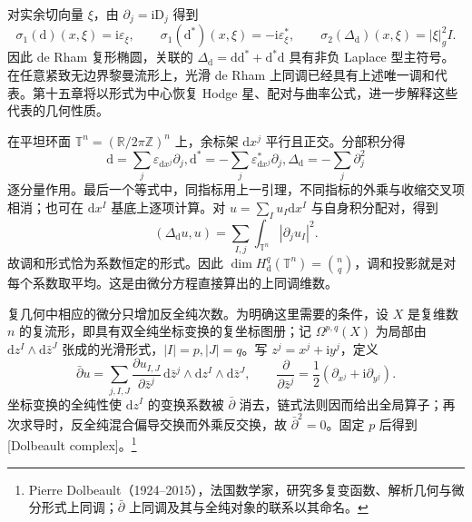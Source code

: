 对实余切向量 \(\xi\)，由 \(\partial_j=\mathrm i\mathrm D_j\) 得到
\[
	\sigma_1(\mathrm d)(x,\xi)=\mathrm i\varepsilon_\xi,
	\qquad
	\sigma_1(\mathrm d^*)(x,\xi)=-\mathrm i\varepsilon_\xi^*,
	\qquad
	\sigma_2(\Delta_{\mathrm d})(x,\xi)=|\xi|_g^2I.
\]
因此 de Rham 复形椭圆，关联的 \(\Delta_{\mathrm d}=\mathrm d\mathrm d^*+\mathrm d^*\mathrm d\) 具有非负 Laplace 型主符号。在任意紧致无边界黎曼流形上，光滑 de Rham 上同调已经具有上述唯一调和代表。第十五章将以形式为中心恢复 Hodge 星、配对与曲率公式，进一步解释这些代表的几何性质。

\begin{example}\label{g3:exm:flat-torus-harmonic-forms}
	在平坦环面 \(\mathbb T^n=(\mathbb R/2\pi\mathbb Z)^n\) 上，余标架 \(\mathrm dx^j\) 平行且正交。分部积分得
	\[
		\mathrm d=\sum_j\varepsilon_{\mathrm dx^j}\partial_j,
		\mathrm d^*=-\sum_j\varepsilon_{\mathrm dx^j}^*\partial_j,
		\Delta_{\mathrm d}=-\sum_j\partial_j^2
	\]
	逐分量作用。最后一个等式中，同指标用上一引理，不同指标的外乘与收缩交叉项相消；也可在 \(\mathrm dx^I\) 基底上逐项计算。对 \(u=\sum_Iu_I\mathrm dx^I\) 与自身积分配对，得到
	\[
		(\Delta_{\mathrm d}u,u)=\sum_{I,j}\int_{\mathbb T^n}|\partial_ju_I|^2.
	\]
	故调和形式恰为系数恒定的形式。因此 \(\dim H_{\mathrm d}^q(\mathbb T^n)=\binom nq\)，调和投影就是对每个系数取平均。这是由微分方程直接算出的上同调维数。
\end{example}

复几何中相应的微分只增加反全纯次数。为明确这里需要的条件，设 \(X\) 是复维数 \(n\) 的复流形，即具有双全纯坐标变换的复坐标图册；记 \(\Omega^{p,q}(X)\) 为局部由 \(\mathrm dz^I\wedge\mathrm d\bar z^J\) 张成的光滑形式，\(|I|=p,|J|=q\)。写 \(z^j=x^j+\mathrm iy^j\)，定义
\[
	\bar\partial u
	=\sum_{j,I,J}\frac{\partial u_{I,J}}{\partial\bar z^j}
	\,\mathrm d\bar z^j\wedge\mathrm dz^I\wedge\mathrm d\bar z^J,
	\qquad
	\frac{\partial}{\partial\bar z^j}
	=\frac12\left(\partial_{x^j}+\mathrm i\partial_{y^j}\right).
\]
坐标变换的全纯性使 \(\mathrm dz^I\) 的变换系数被 \(\bar\partial\) 消去，链式法则因而给出全局算子；再次求导时，反全纯混合偏导交换而外乘反交换，故 \(\bar\partial^2=0\)。固定 \(p\) 后得到[Dolbeault complex]。\footnote{Pierre Dolbeault（1924--2015），法国数学家，研究多复变函数、解析几何与微分形式上同调；\(\bar\partial\) 上同调及其与全纯对象的联系以其命名。}

